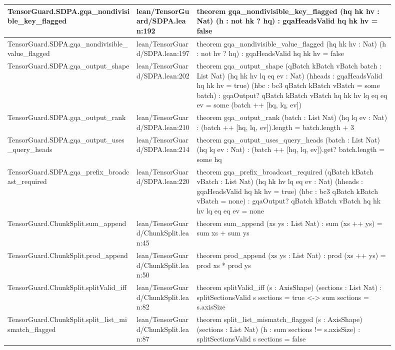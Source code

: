 \documentclass[10pt]{article}
\begin{document}
\begin{longtable}{|p{0.30\linewidth}|p{0.14\linewidth}|p{0.46\linewidth}|}
\hline
TensorGuard.SDPA.gqa\_nondivisible\_key\_flagged & lean/TensorGuard/SDPA.lean:192 & theorem gqa\_nondivisible\_key\_flagged (hq hk hv : Nat) (h : not  hk ? hq) : gqaHeadsValid hq hk hv = false \\
\hline
TensorGuard.SDPA.gqa\_nondivisible\_value\_flagged & lean/TensorGuard/SDPA.lean:197 & theorem gqa\_nondivisible\_value\_flagged (hq hk hv : Nat) (h : not  hv ? hq) : gqaHeadsValid hq hk hv = false \\
\hline
TensorGuard.SDPA.gqa\_output\_shape & lean/TensorGuard/SDPA.lean:202 & theorem gqa\_output\_shape (qBatch kBatch vBatch batch : List Nat) (hq hk hv lq eq ev : Nat) (hheads : gqaHeadsValid hq hk hv = true) (hbc : bc3 qBatch kBatch vBatch = some batch) : gqaOutput? qBatch kBatch vBatch hq hk hv lq eq eq ev = some (batch ++ [hq, lq, ev]) \\
\hline
TensorGuard.SDPA.gqa\_output\_rank & lean/TensorGuard/SDPA.lean:210 & theorem gqa\_output\_rank (batch : List Nat) (hq lq ev : Nat) : (batch ++ [hq, lq, ev]).length = batch.length + 3 \\
\hline
TensorGuard.SDPA.gqa\_output\_uses\_query\_heads & lean/TensorGuard/SDPA.lean:214 & theorem gqa\_output\_uses\_query\_heads (batch : List Nat) (hq lq ev : Nat) : (batch ++ [hq, lq, ev]).get? batch.length = some hq \\
\hline
TensorGuard.SDPA.gqa\_prefix\_broadcast\_required & lean/TensorGuard/SDPA.lean:220 & theorem gqa\_prefix\_broadcast\_required (qBatch kBatch vBatch : List Nat) (hq hk hv lq eq ev : Nat) (hheads : gqaHeadsValid hq hk hv = true) (hbc : bc3 qBatch kBatch vBatch = none) : gqaOutput? qBatch kBatch vBatch hq hk hv lq eq eq ev = none \\
\hline
TensorGuard.ChunkSplit.sum\_append & lean/TensorGuard/ChunkSplit.lean:45 & theorem sum\_append (xs ys : List Nat) : sum (xs ++ ys) = sum xs + sum ys \\
\hline
TensorGuard.ChunkSplit.prod\_append & lean/TensorGuard/ChunkSplit.lean:50 & theorem prod\_append (xs ys : List Nat) : prod (xs ++ ys) = prod xs * prod ys \\
\hline
TensorGuard.ChunkSplit.splitValid\_iff & lean/TensorGuard/ChunkSplit.lean:82 & theorem splitValid\_iff (s : AxisShape) (sections : List Nat) : splitSectionsValid s sections = true <-> sum sections = s.axisSize \\
\hline
TensorGuard.ChunkSplit.split\_list\_mismatch\_flagged & lean/TensorGuard/ChunkSplit.lean:87 & theorem split\_list\_mismatch\_flagged (s : AxisShape) (sections : List Nat) (h : sum sections != s.axisSize) : splitSectionsValid s sections = false \\

\end{longtable}
\end{document}
